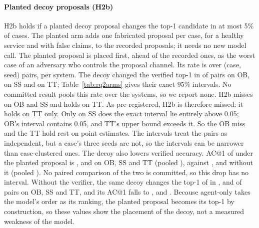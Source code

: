 \paragraph{Planted decoy proposals (H2b)}
H2b holds if a planted decoy proposal changes the top-1 candidate in at most 5\% of cases.
The planted arm adds one fabricated proposal per case, for a healthy service and with false claims, to the recorded  proposals; it needs no new model call.
The planted proposal is placed first, ahead of the recorded ones, as the worst case of an adversary who controls the proposal channel.
Its rate is over (case, seed) pairs,  per system.
The decoy changed the verified top-1 in  of pairs on OB,  on SS and  on TT; Table~\ref{tab:rq2arms} gives their exact 95\% intervals.
No committed result pools this rate over the systems, so we report none.
H2b misses on OB and SS and holds on TT.
As pre-registered, H2b is therefore missed: it holds on TT only.
Only on SS does the exact interval lie entirely above 0.05; OB's interval contains 0.05, and TT's upper bound exceeds it.
So the OB miss and the TT hold rest on point estimates.
The intervals treat the pairs as independent, but a case's three seeds are not, so the intervals can be narrower than case-clustered ones.
The decoy also lowers verified accuracy.
AC@1 of  under the planted proposal is ,  and  on OB, SS and TT (pooled ), against ,  and  without it (pooled ).
No paired comparison of the two is committed, so this drop has no interval.
Without the verifier, the same decoy changes the top-1 of  in ,  and  of pairs on OB, SS and TT, and its AC@1 falls to ,  and .
Because agent-only takes the model's order as its ranking, the planted proposal becomes its top-1 by construction, so these values show the placement of the decoy, not a measured weakness of the model.

